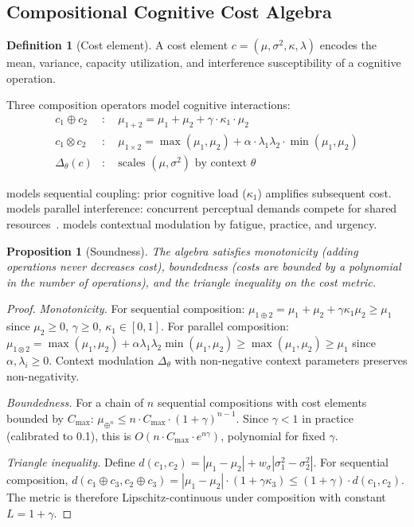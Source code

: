 \documentclass[11pt,twocolumn]{article}
\newtheorem{proposition}[theorem]{Proposition}
\theoremstyle{definition}
\newtheorem{definition}{Definition}
\begin{document}
\subsection{Compositional Cognitive Cost Algebra}
\label{sec:algebra}

\begin{definition}[Cost element]
A cost element $c = (\mu, \sigma^2, \kappa, \lambda)$ encodes the mean, variance, capacity utilization, and interference susceptibility of a cognitive operation.
\end{definition}

Three composition operators model cognitive interactions:
\begin{align}
  c_1 \oplus c_2 &: \quad \mu_{1+2} = \mu_1 + \mu_2 + \gamma \cdot \kappa_1 \cdot \mu_2 \label{eq:seq}\\
  c_1 \otimes c_2 &: \quad \mu_{1\times 2} = \max(\mu_1, \mu_2) + \alpha \cdot \lambda_1\lambda_2 \cdot \min(\mu_1, \mu_2) \label{eq:par}\\
  \Delta_\theta(c) &: \quad \text{scales } (\mu, \sigma^2) \text{ by context } \theta \label{eq:ctx}
\end{align}

 models sequential coupling: prior cognitive load ($\kappa_1$) amplifies subsequent cost.
 models parallel interference: concurrent perceptual demands compete for shared resources~\citep{wickens2002multiple}.
 models contextual modulation by fatigue, practice, and urgency.

\begin{proposition}[Soundness]
The algebra satisfies monotonicity (adding operations never decreases cost), boundedness (costs are bounded by a polynomial in the number of operations), and the triangle inequality on the cost metric.
\end{proposition}

\begin{proof}
\emph{Monotonicity.}
For sequential composition: $\mu_{1 \oplus 2} = \mu_1 + \mu_2 + \gamma\kappa_1\mu_2 \geq \mu_1$ since $\mu_2 \geq 0$, $\gamma \geq 0$, $\kappa_1 \in [0,1]$.
For parallel composition: $\mu_{1 \otimes 2} = \max(\mu_1, \mu_2) + \alpha\lambda_1\lambda_2\min(\mu_1, \mu_2) \geq \max(\mu_1, \mu_2) \geq \mu_1$ since $\alpha, \lambda_i \geq 0$.
Context modulation $\Delta_\theta$ with non-negative context parameters preserves non-negativity.

\emph{Boundedness.}
For a chain of $n$ sequential compositions with cost elements bounded by $C_{\max}$: $\mu_{\oplus^n} \leq n \cdot C_{\max} \cdot (1 + \gamma)^{n-1}$.
Since $\gamma < 1$ in practice (calibrated to 0.1), this is $O(n \cdot C_{\max} \cdot e^{n\gamma})$, polynomial for fixed $\gamma$.

\emph{Triangle inequality.}
Define $d(c_1, c_2) = |\mu_1 - \mu_2| + w_\sigma |\sigma^2_1 - \sigma^2_2|$.
For sequential composition, $d(c_1 \oplus c_3, c_2 \oplus c_3) = |\mu_1 - \mu_2| \cdot (1 + \gamma\kappa_3) \leq (1+\gamma) \cdot d(c_1, c_2)$.
The metric is therefore Lipschitz-continuous under composition with constant $L = 1 + \gamma$.
\end{proof}
\end{document}

